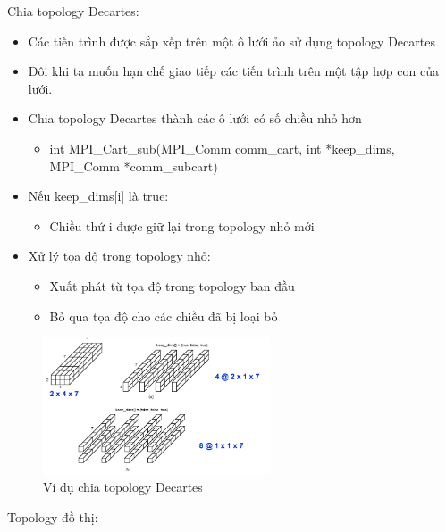 \documentclass[14pt, a4paper]{article}
\numberwithin{equation}{section}
\numberwithin{figure}{section}
\numberwithin{dl}{section}
\numberwithin{md}{section}
\numberwithin{bd}{section}
\numberwithin{dn}{section}
\numberwithin{hq}{section}
\begin{document}
Chia topology Decartes:

\begin{itemize}
    \item Các tiến trình được sắp xếp trên một ô lưới ảo sử dụng topology Decartes
    \item Đôi khi ta muốn hạn chế giao tiếp các tiến trình trên một tập hợp con của lưới.
    \item Chia topology Decartes thành các ô lưới có số chiều nhỏ hơn
    \begin{itemize}
        \item int MPI\_Cart\_sub(MPI\_Comm comm\_cart, int *keep\_dims,
                                 MPI\_Comm *comm\_subcart) 
    \end{itemize}
    \item Nếu keep\_dims[i] là true:
    \begin{itemize}
        \item Chiều thứ i được giữ lại trong topology nhỏ mới
    \end{itemize}
    \item Xử lý tọa độ trong topology nhỏ:
    \begin{itemize}
        \item Xuất phát từ tọa độ trong topology ban đầu
        \item Bỏ qua tọa độ cho các chiều đã bị loại bỏ
    \end{itemize}
\end{itemize}

\begin{figure}[H]
    \centering
    \includegraphics[width=0.6\textwidth]{figures/MPI/Cartesion_sub.png}
    \caption{Ví dụ chia topology Decartes}
\end{figure}

Topology đồ thị:
\end{document}
